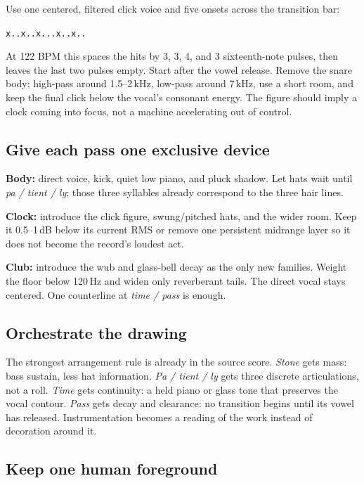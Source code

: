 \documentclass[10pt,letterpaper,twocolumn]{article}
\begin{document}
Use one centered, filtered click voice and five onsets across the transition bar:

\begin{center}
\texttt{x..x..x...x..x..}
\end{center}

At 122 BPM this spaces the hits by 3, 3, 4, and 3 sixteenth-note pulses, then leaves the last two pulses empty. Start after the vowel release. Remove the snare body; high-pass around 1.5--2\,kHz, low-pass around 7\,kHz, use a short room, and keep the final click below the vocal's consonant energy. The figure should imply a clock coming into focus, not a machine accelerating out of control.

\subsection{Give each pass one exclusive device}

\textbf{Body:} direct voice, kick, quiet low piano, and pluck shadow. Let hats wait until \textit{pa / tient / ly}; those three syllables already correspond to the three hair lines.

\textbf{Clock:} introduce the click figure, swung/pitched hats, and the wider room. Keep it 0.5--1\,dB below its current RMS or remove one persistent midrange layer so it does not become the record's loudest act.

\textbf{Club:} introduce the wub and glass-bell decay as the only new families. Weight the floor below 120\,Hz and widen only reverberant tails. The direct vocal stays centered. One counterline at \textit{time / pass} is enough.

\subsection{Orchestrate the drawing}

The strongest arrangement rule is already in the source score. \textit{Stone} gets mass: bass sustain, less hat information. \textit{Pa / tient / ly} gets three discrete articulations, not a roll. \textit{Time} gets continuity: a held piano or glass tone that preserves the vocal contour. \textit{Pass} gets decay and clearance: no transition begins until its vowel has released. Instrumentation becomes a reading of the work instead of decoration around it.

\subsection{Keep one human foreground}
\end{document}
